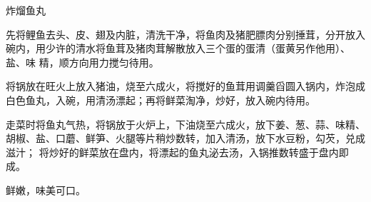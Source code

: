 %
%
%
%
%
%
%
\begin{recipe}{炸熘鱼丸}

\ingredients


\preparation

\step 先将鲤鱼去头、皮、翅及内脏，清洗干净，将鱼肉及猪肥膘肉分别捶茸，分开放入
碗内，用少许的清水将鱼茸及猪肉茸解散放入三个蛋的蛋清（蛋黄另作他用）、盐、味
精，顺方向用力搅匀待用。

\step 将锅放在旺火上放入猪油，烧至六成火，将搅好的鱼茸用调羹舀圆入锅内，炸泡成
白色鱼丸，入碗，用清汤漂起；再将鲜菜淘净，炒好，放入碗内待用。

\step 走菜时将鱼丸气热，将锅放于火炉上，下油烧至六成火，放下姜、葱、蒜、味精、
胡椒、盐、口蘑、鲜笋、火腿等片稍炒数转，加入清汤，放下水豆粉，勾芡，兑成滋汁；
将炒好的鲜菜放在盘内，将漂起的鱼丸泌去汤，入锅推数转盛于盘内即成。

\features

鲜嫩，味美可口。

\end{recipe}

